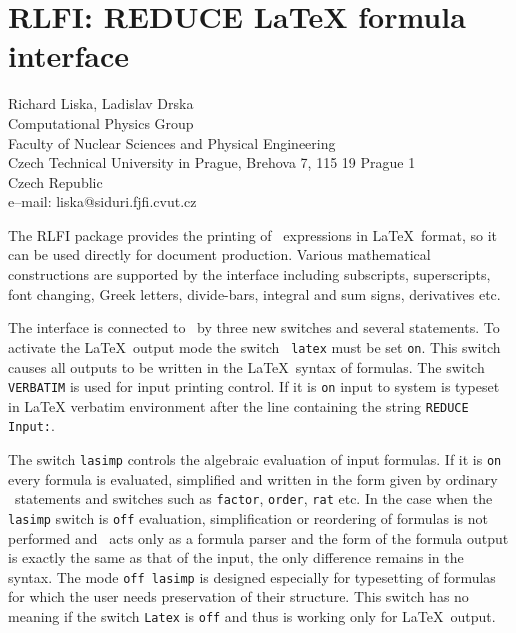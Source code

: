 \chapter{RLFI: REDUCE LaTeX formula interface}
\label{RLFI}

{\footnotesize
\begin{center}
Richard Liska, Ladislav Drska\\
Computational Physics Group \\
Faculty of Nuclear Sciences and Physical Engineering\\
Czech Technical University in Prague, Brehova 7, 115 19 Prague 1 \\
Czech Republic\\[0.05in]
e--mail: liska@siduri.fjfi.cvut.cz
\end{center}
}


The RLFI package provides the printing of \REDUCE\ expressions in
\LaTeX\ format, so it can be used directly for document production.
Various mathematical
constructions are supported by the interface including subscripts,
superscripts, font changing, Greek letters, divide-bars, integral and
sum signs, derivatives etc.

The interface is connected to \REDUCE\ by three new switches and
several statements.  To activate the \LaTeX\ output mode the switch {\tt
latex} must be set {\tt on}.  This switch causes all
outputs to be written in the \LaTeX\ syntax of formulas.  The switch
{\tt VERBATIM} is used for input printing control.
If it is {\tt on} input to \REDUCE{} system is typeset in \LaTeX{}
verbatim environment after the line containing the string {\tt REDUCE Input:}.

The switch {\tt lasimp} controls the algebraic
evaluation of input
formulas.  If it is {\tt on} every formula is evaluated, simplified and
written in the form given by ordinary \REDUCE\ statements and switches
such as {\tt factor}, {\tt order}, {\tt rat} etc.  In the case when the
{\tt lasimp} switch is {\tt off} evaluation, simplification or
reordering of formulas is not performed and \REDUCE\ acts only as a
formula parser and the form of the formula output is exactly the same as
that of the input, the only difference remains in the syntax.  The mode
{\tt off lasimp} is designed especially for typesetting of formulas for
which the user needs preservation of their structure.  This switch has
no meaning if the switch {\tt Latex} is {\tt off} and thus is working
only for \LaTeX\ output.


